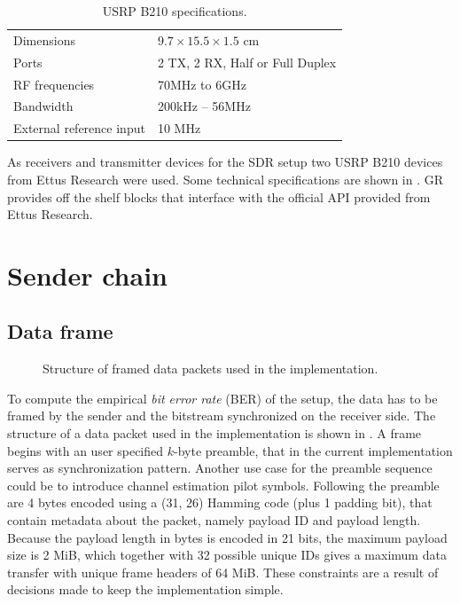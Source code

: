 \begin{table}[b]
	\centering
	\begin{tabular}{ll}
		\toprule
		Dimensions               & \(9.7 \times 15.5 \times 1.5\) cm \\
		Ports                    & 2 TX, 2 RX, Half or Full Duplex   \\
		RF frequencies           & 70MHz to 6GHz                     \\
		Bandwidth                & 200kHz -- 56MHz                   \\
		External reference input & 10 MHz                            \\
		\bottomrule
	\end{tabular}
	\caption{USRP B210 specifications.\label{tab:usrp-specs}}
\end{table}

As receivers and transmitter devices for the SDR setup two USRP B210 devices from Ettus Research were used. Some technical specifications are shown in . GR provides off the shelf blocks that interface with the official API provided from Ettus Research.

\section{Sender chain}
\subsection{Data frame}

\begin{figure}
\centering

	\caption{
		Structure of framed data packets used in the implementation.
		\label{fig:dataframe}
	}
\end{figure}

To compute the empirical \emph{bit error rate} (BER) of the setup, the data has to be framed by the sender and the bitstream synchronized on the receiver side. The structure of a data packet used in the implementation is shown in . A frame begins with an user specified \(k\)-byte preamble, that in the current implementation serves as synchronization pattern. Another use case for the preamble sequence could be to introduce channel estimation pilot symbols. Following the preamble are 4 bytes encoded using a (31, 26) Hamming code (plus 1 padding bit), that contain metadata about the packet, namely payload ID and payload length. Because the payload length in bytes is encoded in 21 bits, the maximum payload size is 2 MiB, which together with 32 possible unique IDs gives a maximum data transfer with unique frame headers of 64 MiB. These constraints are a result of decisions made to keep the implementation simple.


